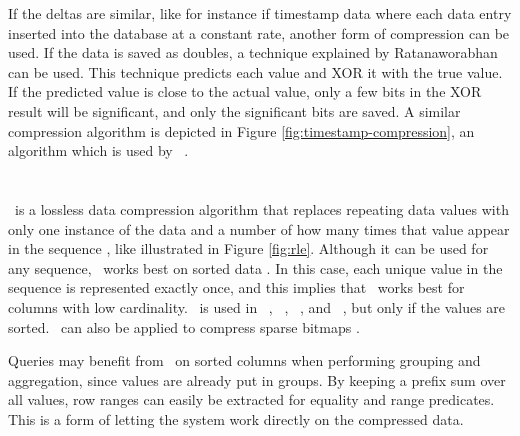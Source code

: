 If the deltas are similar, like for instance if timestamp data where each data entry inserted into the database at a constant rate, another form of compression can be used. If the data is saved as doubles, a technique explained by Ratanaworabhan \ea~\cite{Ratanaworabhan2006-jb} can be used. This technique predicts each value and XOR it with the true value. If the predicted value is close to the actual value, only a few bits in the XOR result will be significant, and only the significant bits are saved. A similar compression algorithm is depicted in Figure \ref{fig:timestamp-compression}, an algorithm which is used by \gorilla~\cite{Pelkonen2015-ko}.

\section{\rle}
\label{sec:Run-Length Encoding}
\rle~is a lossless data compression algorithm that replaces repeating data values with only one instance of the data and a number of how many times that value appear in the sequence \cite{Stoimen_undated-js}, like illustrated in Figure \ref{fig:rle}. Although it can be used for any sequence, \rle~works best on sorted data \cite{Bjorklund2011-wh, Holloway2008-rr}. In this case, each unique value in the sequence is represented exactly once, and this implies that \rle~works best for columns with low cardinality. \rle~is used in \cstore~\cite{Stonebraker2005-qz}, \vertica~\cite{Lamb2012-kg}, \oracle~\cite{Oracle2015-fs}, and \sapnw~\cite{Lemke2010-is}, but only if the values are sorted. \rle~can also be applied to compress sparse bitmaps \cite{Stonebraker2005-qz}.

Queries may benefit from \rle~on sorted columns when performing grouping and aggregation, since values are already put in groups. By keeping a prefix sum over all values, row ranges can easily be extracted for equality and range predicates. This is a form of letting the system work directly on the compressed data. 


